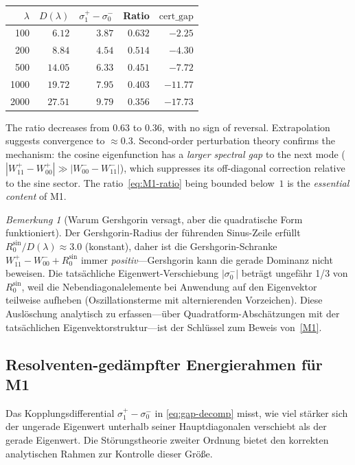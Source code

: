 ﻿\documentclass[12pt,a4paper]{article}
\theoremstyle{definition}
\theoremstyle{remark}
\newtheorem{remark}[theorem]{Bemerkung}
\begin{document}
\begin{center}
\small
\renewcommand{\arraystretch}{1.15}
\begin{tabular}{r|r|r|r|r}
$\lambda$ & $D(\lambda)$ & $\sigma_1^+\! -\! \sigma_0^-$ & Ratio & $\mathrm{cert\_gap}$ \\\hline
100  & $6.12$  & $3.87$ & $0.632$ & $-2.25$ \\
200  & $8.84$  & $4.54$ & $0.514$ & $-4.30$ \\
500  & $14.05$ & $6.33$ & $0.451$ & $-7.72$ \\
1000 & $19.72$ & $7.95$ & $0.403$ & $-11.77$ \\
2000 & $27.51$ & $9.79$ & $0.356$ & $-17.73$
\end{tabular}
\end{center}

\noindent The ratio decreases from $0.63$ to $0.36$, with no sign of reversal. Extrapolation suggests convergence to $\approx 0.3$. Second-order perturbation theory confirms the mechanism: the cosine eigenfunction has a \emph{larger spectral gap} to the next mode ($|W_{11}^+ - W_{00}^+| \gg |W_{00}^- - W_{11}^-|$), which suppresses its off-diagonal correction relative to the sine sector. The ratio~\eqref{eq:M1-ratio} being bounded below~$1$ is the \emph{essential content} of M1.

\begin{remark}[Warum Gershgorin versagt, aber die quadratische Form funktioniert]
Der Gershgorin-Radius der führenden Sinus-Zeile erfüllt $R_0^{\sin}/D(\lambda) \approx 3.0$ (konstant), daher ist die Gershgorin-Schranke $W_{11}^+ - W_{00}^- + R_0^{\sin}$ immer \emph{positiv}---Gershgorin kann die gerade Dominanz nicht beweisen. Die tatsächliche Eigenwert-Verschiebung $|\sigma_0^-|$ beträgt ungefähr 1/3 von $R_0^{\sin}$, weil die Nebendiagonalelemente bei Anwendung auf den Eigenvektor teilweise aufheben (Oszillationsterme mit alternierenden Vorzeichen). Diese Auslöschung analytisch zu erfassen---über Quadratform-Abschätzungen mit der tatsächlichen Eigenvektorstruktur---ist der Schlüssel zum Beweis von~\ref{M1}.
\end{remark}


\subsection{Resolventen-ged\"ampfter Energierahmen f\"ur M1}
\label{sec:resolvent-M1}

Das Kopplungsdifferential $\sigma_1^+ - \sigma_0^-$ in \eqref{eq:gap-decomp} misst, wie viel stärker sich der ungerade Eigenwert unterhalb seiner Hauptdiagonalen verschiebt als der gerade Eigenwert. Die Störungstheorie zweiter Ordnung bietet den korrekten analytischen Rahmen zur Kontrolle dieser Größe.
\end{document}

